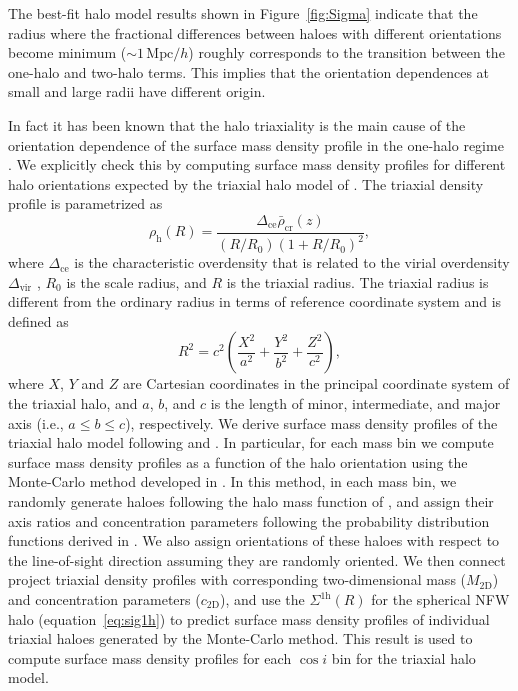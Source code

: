 \documentclass[a4paper,fleqn,usenatbib]{mnras}
\newcommand{\beq}{\begin{equation}}
\newcommand{\eeq}{\end{equation}}
\newcommand{\vir}{\mathrm{vir}}
\newcommand{\Mpc}{\mathrm{Mpc}}
\begin{document}
The best-fit halo model results shown in Figure~\ref{fig:Sigma}
indicate that the radius where the fractional differences between
haloes with different orientations become minimum ($\sim 1\,\Mpc/h$)
roughly corresponds to the transition between the one-halo and two-halo
terms. This implies that the orientation dependences at small and
large radii have different origin.

In fact it has been known that the halo triaxiality is the main cause
of the orientation dependence of the surface mass density profile in
the one-halo regime
\citep{Oguri2005,Gavazzi2005,Corless2007,Limousin2013}.
We explicitly check this by computing surface mass density profiles
for different halo orientations expected by the triaxial halo model of
\citet{Jing2002}. The triaxial density profile is parametrized as
\beq
\rho_{\mathrm{h}}(R) = \frac{\Delta_\mathrm{ce} \bar{\rho}_\mathrm{cr} (z)}{(R/R_0) (1+R/R_0)^2},
\label{eq:halo_triaxial}
\eeq
where $\Delta_\mathrm{ce}$ is the characteristic overdensity that is
related to the virial overdensity $\Delta_\vir$
\citep[see][]{Jing2002}, $R_0$ is the scale radius, and $R$ is the
triaxial radius. The triaxial radius is different from the ordinary
radius in terms of reference coordinate system and is defined as
\beq
R^2 = c^2 \left(\frac{X^2}{a^2} + \frac{Y^2}{b^2} + \frac{Z^2}{c^2}\right),
\eeq
where $X$, $Y$ and $Z$ are Cartesian coordinates in the principal coordinate system
of the triaxial halo, and $a$, $b$, and $c$ is the length of minor, intermediate,
and major axis (i.e., $a \leq b \leq c$), respectively.
We derive surface mass density profiles
of the triaxial halo model following \citet{Oguri2003} and
\citet{Oguri2009}. In particular, for each mass bin we compute surface
mass density profiles as a function of the halo orientation using the
Monte-Carlo method developed in \citet{Oguri2009}. In this method, in
each mass bin, we randomly generate haloes following the halo mass
function of \citet{Bhattacharya2011}, and assign their axis ratios and
concentration parameters following the probability distribution
functions derived in \citet{Jing2002}. We also assign
orientations of these haloes with respect to the line-of-sight
direction assuming they are randomly oriented. We then connect
project triaxial density profiles with corresponding two-dimensional
mass ($M_\mathrm{2D}$) and concentration parameters ($c_\mathrm{2D}$), and use
the $\Sigma^\mathrm{1h}(R)$ for the spherical NFW halo
(equation~\ref{eq:sig1h}) to predict surface mass density profiles of
individual triaxial haloes generated by the Monte-Carlo method.
This result is used to compute surface mass density profiles for each
$\cos i$ bin for the triaxial halo model.
\end{document}
